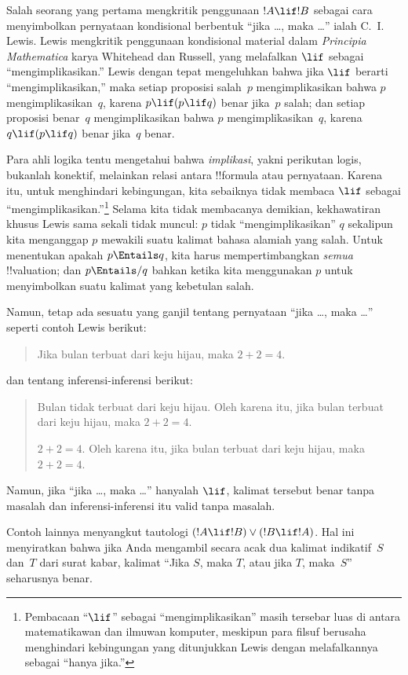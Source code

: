 \documentclass[../../../include/open-logic-section]{subfiles}
\begin{document}


Salah seorang yang pertama mengkritik penggunaan $!A \lif !B$ sebagai cara
menyimbolkan pernyataan kondisional berbentuk ``jika \dots, maka \dots''
ialah C.~I. Lewis. Lewis mengkritik penggunaan kondisional material dalam
\emph{Principia Mathematica} karya Whitehead dan Russell, yang melafalkan
$\lif$ sebagai ``mengimplikasikan.'' Lewis dengan tepat mengeluhkan bahwa
jika $\lif$ berarti ``mengimplikasikan,'' maka setiap proposisi salah~$p$
mengimplikasikan bahwa $p$ mengimplikasikan~$q$, karena
$p \lif (p \lif q)$ benar jika~$p$ salah; dan setiap proposisi benar~$q$
mengimplikasikan bahwa $p$ mengimplikasikan~$q$, karena
$q \lif (p \lif q)$ benar jika~$q$ benar.

Para ahli logika tentu mengetahui bahwa \emph{implikasi}, yakni perikutan
logis, bukanlah konektif, melainkan relasi antara !!{formula} atau pernyataan.
Karena itu, untuk menghindari kebingungan, kita sebaiknya tidak membaca
$\lif$ sebagai ``mengimplikasikan.''\footnote{Pembacaan ``$\lif$'' sebagai
  ``mengimplikasikan'' masih tersebar luas di antara matematikawan dan
  ilmuwan komputer, meskipun para filsuf berusaha menghindari kebingungan
  yang ditunjukkan Lewis dengan melafalkannya sebagai ``hanya jika.''}
Selama kita tidak membacanya demikian, kekhawatiran khusus Lewis sama sekali
tidak muncul: $p$ tidak ``mengimplikasikan'' $q$ sekalipun kita menganggap
$p$ mewakili suatu kalimat bahasa alamiah yang salah. Untuk menentukan
apakah $p \Entails q$, kita harus mempertimbangkan \emph{semua}
!!{valuation}; dan $p \Entails/ q$ bahkan ketika kita menggunakan $p$ untuk
menyimbolkan suatu kalimat yang kebetulan salah.

Namun, tetap ada sesuatu yang ganjil tentang pernyataan ``jika \dots, maka
\dots'' seperti contoh Lewis berikut:
\begin{quote}
Jika bulan terbuat dari keju hijau, maka $2+2=4$.
\end{quote}
dan tentang inferensi-inferensi berikut:
\begin{quote}
  Bulan tidak terbuat dari keju hijau. Oleh karena itu, jika bulan terbuat
  dari keju hijau, maka $2+2=4$.

  $2+2 = 4$. Oleh karena itu, jika bulan terbuat dari keju hijau, maka
  $2+2=4$.
\end{quote}
Namun, jika ``jika \dots, maka \dots'' hanyalah $\lif$, kalimat tersebut
benar tanpa masalah dan inferensi-inferensi itu valid tanpa masalah.

Contoh lainnya menyangkut tautologi
$(!A \lif !B) \lor (!B \lif !A)$. Hal ini menyiratkan bahwa jika Anda
mengambil secara acak dua kalimat indikatif~$S$ dan~$T$ dari surat kabar,
kalimat ``Jika $S$, maka $T$, atau jika $T$, maka~$S$'' seharusnya benar.
\end{document}

